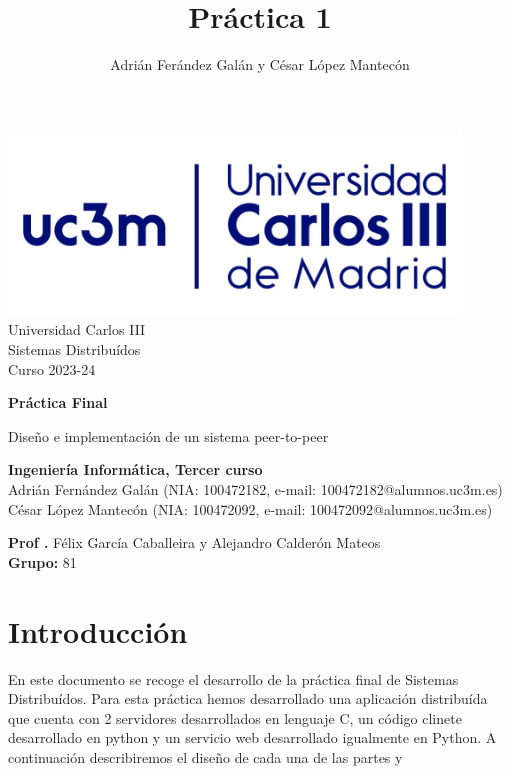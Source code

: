 \documentclass[]{article}
\title{Práctica 1}
\author{Adrián Ferández Galán y César López Mantecón}
\begin{document}
\begin{titlepage}
    \centering
   \includegraphics[width=0.9\textwidth]{uc3m.jpg} 
    {\Huge Universidad Carlos III\\
    
     \Large Sistemas Distribuídos\\
     \vspace{0.5cm}
     Curso 2023-24}
    \vspace{2cm}

    {\Huge \textbf{Práctica Final} \par}
    \vspace{0.5cm}
    {\Large Diseño e implementación de un sistema peer-to-peer \par}
    \vspace{8cm}

   \textbf{Ingeniería Informática, Tercer curso}\\
    \vspace{0.2cm} 
    Adrián Fernández Galán (NIA: 100472182, e-mail: 100472182@alumnos.uc3m.es) \\
    César López Mantecón   (NIA: 100472092, e-mail: 100472092@alumnos.uc3m.es)
    \vspace{0.5cm}

   
    \textbf{Prof .} Félix García Caballeira y Alejandro Calderón Mateos\\
    
    \textbf{Grupo: } 81   
    
\end{titlepage}
\newpage

\renewcommand{\contentsname}{\centering Índice}
\tableofcontents

\newpage

\section{Introducción}
\label{sec:introduccion}
En este documento se recoge el desarrollo de la práctica final de Sistemas Distribuídos. Para esta práctica hemos desarrollado una aplicación distribuída que cuenta con 2 servidores desarrollados en lenguaje C, un código clinete desarrollado en python y un servicio web desarrollado igualmente en Python. A continuación describiremos el diseño de cada una de las partes y 
\end{document}
